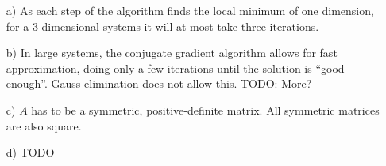 \documentclass[10pt,DIV10,a4paper]{scrartcl}
\begin{document}
\begin{itemize}
    \item[a)] As each step of the algorithm finds the local minimum of one dimension, for a 3-dimensional systems it will at most take three iterations.
    \item[b)] In large systems, the conjugate gradient algorithm allows for fast approximation, doing only a few iterations until the solution is “good enough”. Gauss elimination does not allow this. TODO: More?
    \item[c)] $A$ has to be a symmetric, positive-definite matrix. All symmetric matrices are also square.
    \item[d)] TODO
\end{itemize}
\end{document}
